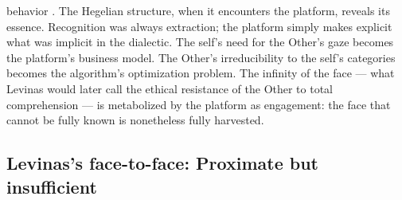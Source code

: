 behavior \cite[pp.~8--67]{zuboff_2019}. The Hegelian structure, when it encounters the platform, reveals its essence. Recognition was always extraction; the platform simply makes explicit what was implicit in the dialectic. The self’s need for the Other’s gaze becomes the platform’s business model. The Other’s irreducibility to the self’s categories becomes the algorithm’s optimization problem. The infinity of the face — what Levinas would later call the ethical resistance of the Other to total comprehension — is metabolized by the platform as engagement: the face that cannot be fully known is nonetheless fully harvested.

\subsection{Levinas's face-to-face: Proximate but insufficient}

